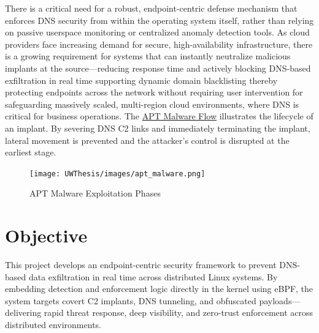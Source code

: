 \documentclass [11pt, proquest] {uwthesis}[2020/02/24]
\begin{document}
There is a critical need for a robust, endpoint-centric defense mechanism that enforces DNS security from within the operating system itself, rather than relying on passive userspace monitoring or centralized anomaly detection tools. As cloud providers face increasing demand for secure, high-availability infrastructure, there is a growing requirement for systems that can instantly neutralize malicious implants at the source—reducing response time and actively blocking DNS-based exfiltration in real time supporting dynamic domain blacklisting thereby protecting endpoints across the network without requiring user intervention for safeguarding massively scaled, multi-region cloud environments, where DNS is critical for business operations.
The \hyperref[sec:apt_malware_flow]{APT Malware Flow} illustrates the lifecycle of an implant. By severing DNS C2 links and immediately terminating the implant, lateral movement is prevented and the attacker’s control is disrupted at the earliest stage.
\begin{figure}[H]
\texttt{[image: UWThesis/images/apt\_malware.png]}
\caption{APT Malware Exploitation Phases}
\label{sec:apt_malware_flow}
\end{figure}

\section{Objective}
This project develops an endpoint-centric security framework to prevent DNS-based data exfiltration in real time across distributed Linux systems. By embedding detection and enforcement logic directly in the kernel using eBPF, the system targets covert C2 implants, DNS tunneling, and obfuscated payloads—delivering rapid threat response, deep visibility, and zero-trust enforcement across distributed environments.
\end{document}
